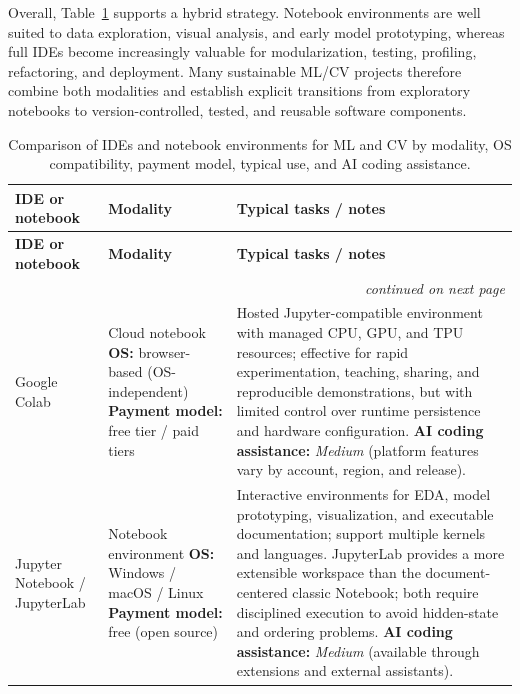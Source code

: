 \documentclass{article}
\newcounter{entry}[section]
\renewcommand{\theentry}{\thesection.\arabic{entry}}
\newcommand{\EntryRow}[5]{
    \noalign{
        \stepcounter{entry}
        \xdef\ENTRYNUM{\theentry}
        \phantomsection\label{entry:#1}
        \addcontentsline{toc}{subsubsection}{\ENTRYNUM\hspace{0.5cm}#2}
    }
    #2 #3 & #4 & #5 \\
    \hline
}
\begin{document}
Overall, Table~\ref{table:overview_IDEs_notebooks} supports a hybrid strategy. Notebook environments are well suited to data exploration, visual analysis, and early model prototyping, whereas full IDEs become increasingly valuable for modularization, testing, profiling, refactoring, and deployment. Many sustainable ML/CV projects therefore combine both modalities and establish explicit transitions from exploratory notebooks to version-controlled, tested, and reusable software components.




\clearpage




\begin{longtable}{|p{}|p{}|p{}|}
    \caption{Comparison of IDEs and notebook environments for ML and CV by modality, OS compatibility, payment model, typical use, and AI coding assistance.}
    \label{table:overview_IDEs_notebooks} \\


    \hline
    \textbf{IDE or notebook} & \textbf{Modality} & \textbf{Typical tasks / notes} \\
    \hline
    \endfirsthead

    \hline
    \textbf{IDE or notebook} & \textbf{Modality} & \textbf{Typical tasks / notes} \\
    \hline
    \endhead

    \multicolumn{3}{r}{\textit{continued on next page}} \\
    \endfoot

    \endlastfoot


    \EntryRow{google_colab}{Google Colab}{\cite{bisong2019google}}{Cloud notebook \newline \textbf{OS:} browser-based (OS-independent) \newline \textbf{Payment model:} free tier / paid tiers}{Hosted Jupyter-compatible environment with managed CPU, GPU, and TPU resources; effective for rapid experimentation, teaching, sharing, and reproducible demonstrations, but with limited control over runtime persistence and hardware configuration. \newline \textbf{AI coding assistance:} \textit{Medium} (platform features vary by account, region, and release).}

    \EntryRow{jupyter_notebook_jupyterlab}{Jupyter Notebook / JupyterLab}{\cite{kluyver2016jupyter,perkel2018jupyter}}{Notebook environment \newline \textbf{OS:} Windows / macOS / Linux \newline \textbf{Payment model:} free (open source)}{Interactive environments for EDA, model prototyping, visualization, and executable documentation; support multiple kernels and languages. JupyterLab provides a more extensible workspace than the document-centered classic Notebook; both require disciplined execution to avoid hidden-state and ordering problems. \newline \textbf{AI coding assistance:} \textit{Medium} (available through extensions and external assistants).}


\end{longtable}
\end{document}
